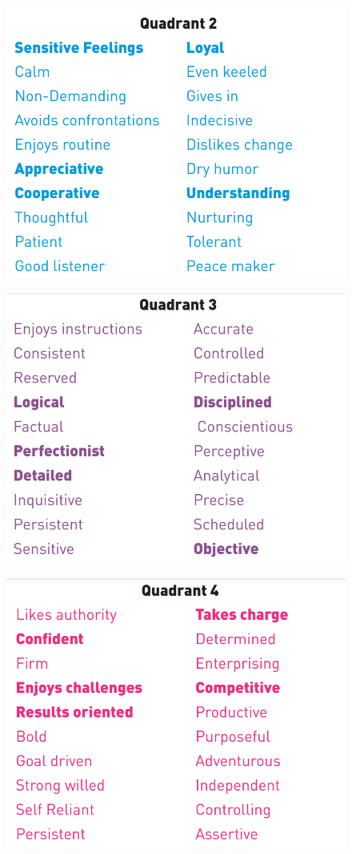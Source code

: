 \begin{figure}[H]
    \centering
    \includegraphics[width=0.8\linewidth]{images/ws2.png}
\end{figure}

\begin{figure}[H]
    \centering
    \includegraphics[width=0.8\linewidth]{images/ws3.png}
\end{figure}

\begin{figure}[H]
    \centering
    \includegraphics[width=0.8\linewidth]{images/ws4.png}
\end{figure}

